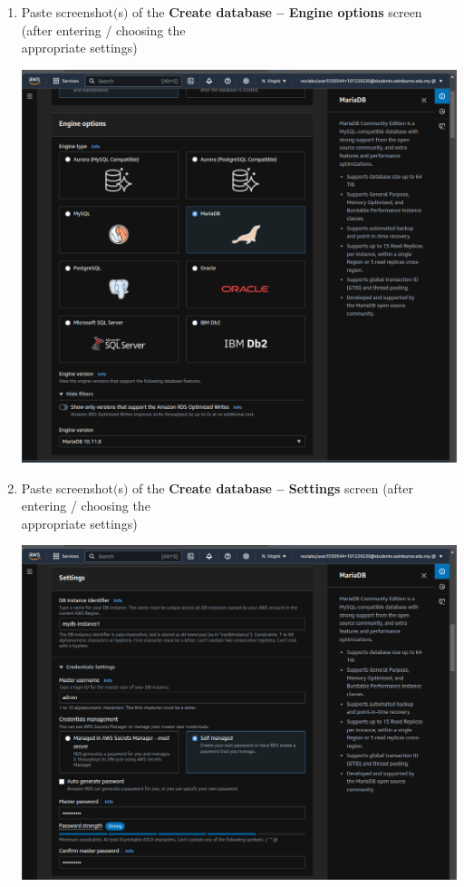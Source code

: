 \documentclass[11pt]{article}
\begin{document}
\begin{enumerate}[resume]
    \vspace{50mm}
    \item Paste screenshot$($s$)$ of the \textbf{Create database – Engine options} screen (after entering / choosing the \\ appropriate settings) \\
    \vspace{5mm}

    {\centering
    \includegraphics[width=5.8in]{pics/26.png}
    }


    \item Paste screenshot$($s$)$ of the \textbf{Create database – Settings} screen (after entering / choosing the \\ appropriate settings) \\
    \vspace{5mm}

    {\centering
    \includegraphics[width=5.8in]{pics/27.png}
    }



\end{enumerate}
\end{document}
